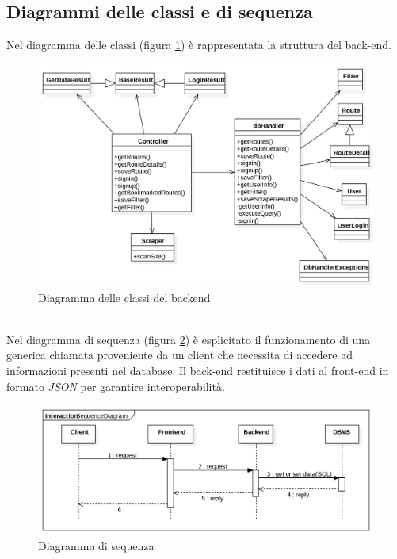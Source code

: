 \documentclass[11pt]{report}
\begin{document}
\subsection{Diagrammi delle classi e di sequenza}
Nel diagramma delle classi (figura \ref{class_diagram_backend}) è rappresentata la struttura del back-end.
\begin{figure}[h]
	\centering
	\includegraphics[scale=0.45]{ClassDiagram_Backend}
	\caption{Diagramma delle classi del backend \label{class_diagram_backend}}
\end{figure}
\\Nel diagramma di sequenza (figura \ref{sequence_diagram}) è esplicitato il funzionamento di una generica chiamata proveniente da un client che necessita di accedere ad informazioni presenti nel database.
Il back-end restituisce i dati al front-end in formato \textit{JSON} per garantire interoperabilità.
\begin{figure}[h]
	\centering
	\includegraphics[scale=0.45]{SequenceDiagram}
	\caption{Diagramma di sequenza \label{sequence_diagram}}
\end{figure}
\end{document}
